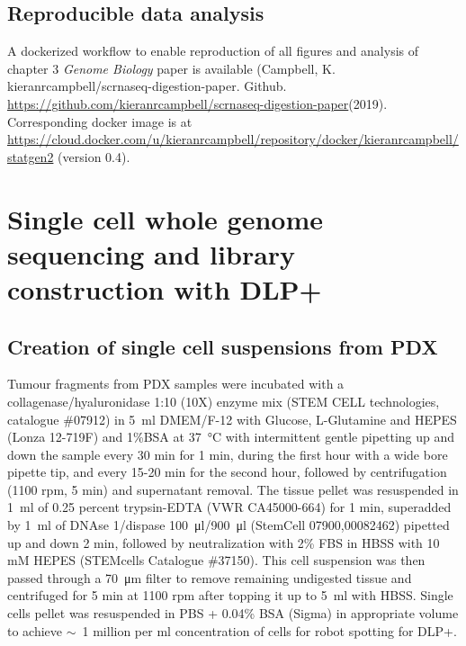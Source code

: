 \subsection{Reproducible data analysis}
A dockerized workflow to enable reproduction of all figures and analysis of chapter 3 \textit{Genome Biology} paper is available (Campbell, K. kieranrcampbell/scrnaseq-digestion-paper. Github. \url{https://github.com/kieranrcampbell/scrnaseq-digestion-paper}(2019). Corresponding docker image is at \url{https://cloud.docker.com/u/kieranrcampbell/repository/docker/kieranrcampbell/statgen2} (version 0.4).

\section{Single cell whole genome sequencing and library construction with DLP+}

\subsection{Creation of single cell suspensions from PDX}
Tumour fragments from PDX samples were incubated with a collagenase/hyaluronidase 1:10 (10X) enzyme mix (STEM CELL technologies, catalogue \#07912) in  \SI{5}{\ml} DMEM/F-12 with Glucose, L-Glutamine and HEPES (Lonza 12-719F) and 1\%BSA at \SI{37}{\degreeCelsius} with intermittent gentle pipetting up and down the sample every 30 min for 1 min, during the first hour with a wide bore pipette tip, and every 15-20 min for the second hour, followed by  centrifugation (1100 rpm, 5 min) and supernatant removal.
The tissue pellet was resuspended in \SI{1}{\ml} of  0.25 percent trypsin-EDTA (VWR CA45000-664) for 1 min, superadded by \SI{1}{\ml} of DNAse 1/dispase \SI{100}{\ul}/\SI{900}{\ul} (StemCell 07900,00082462) pipetted up and down 2 min, followed by neutralization with 2\% FBS in HBSS with 10 mM HEPES (STEMcells Catalogue \#37150). 
This cell suspension was then passed through a \SI{70}{\micro\metre} filter to remove remaining undigested tissue and centrifuged for 5 min at 1100 rpm after topping it up to \SI{5}{\ml} with HBSS.
Single cells pellet  was resuspended in PBS + 0.04\% BSA (Sigma) in appropriate volume to achieve  $\sim$~1 million per ml concentration of cells for robot spotting for DLP+.

